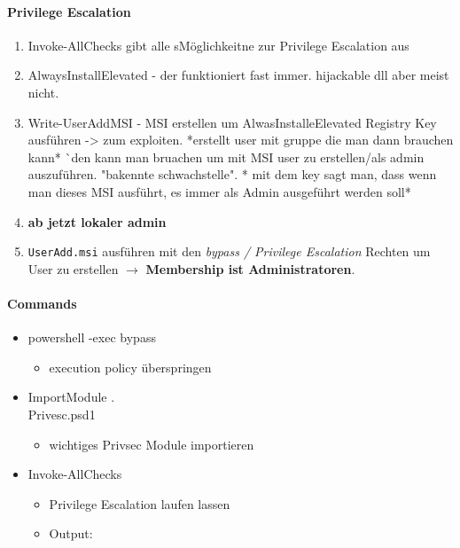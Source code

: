 \paragraph{Privilege Escalation}
\begin{enumerate}
    \item Invoke-AllChecks gibt alle sMöglichkeitne zur Privilege Escalation aus
    \item AlwaysInstallElevated - der funktioniert fast immer. hijackable dll aber meist nicht.
    \item Write-UserAddMSI - MSI erstellen um AlwasInstalleElevated Registry Key ausführen -> zum exploiten. *erstellt user mit gruppe die man dann brauchen kann*
    ^^ den kann man bruachen um mit MSI user zu erstellen/als admin auszuführen. "bakennte schwachstelle". * mit dem key sagt man, dass wenn man dieses MSI ausführt, es immer als Admin ausgeführt werden soll* 
    \item \textbf{ab jetzt lokaler admin}
    \item \lstinline|UserAdd.msi| ausführen mit den \textit{bypass / Privilege Escalation} Rechten um User zu erstellen $\rightarrow$ \textbf{Membership ist Administratoren}.
\end{enumerate}

\paragraph{Commands}
\begin{itemize}
    \item powershell -exec bypass
    \begin{itemize}
        \item execution policy überspringen
    \end{itemize}
    \item Import\-Module .\\Privesc.psd1
    \begin{itemize}
        \item wichtiges Privsec Module importieren
    \end{itemize}
    \item Invoke-AllChecks
    \begin{itemize}
        \item Privilege Escalation laufen lassen
        \item Output:
    \end{itemize}
\end{itemize}


